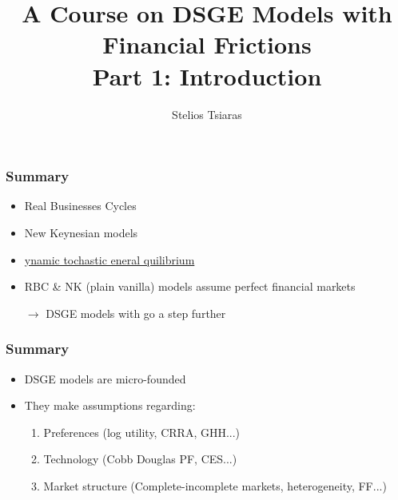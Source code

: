 \documentclass[xcolor=dvipsnames,handout,aspectratio=169]{beamer}
\title[\today]{\textbf{A Course on DSGE Models with Financial Frictions \\ Part 1: Introduction}}
\author{Stelios Tsiaras}
\institute{European University Institute}
\begin{document}
\begin{frame}[noframenumbering]
\titlepage 
\end{frame}

\begin{frame}[c]\frametitle {\textbf{Summary}} \label{conclusion}
\begin{itemize}
    \setlength\itemsep{2em}
    \item Real Businesses Cycles 
    \item New Keynesian models 
    \item \underline{{\color{Magenta}{D}}ynamic {\color{Magenta}{S}}tochastic {\color{Magenta}{G}}eneral {\color{Magenta}{E}}quilibrium}
    \item RBC \& NK (plain vanilla) models assume perfect financial markets 

$\rightarrow$ DSGE models with {\color{Magenta}{financial frictions}} go a step further
\end{itemize}
\end{frame}

\begin{frame}[c]\frametitle {\textbf{Summary}} \label{conclusion}
\begin{itemize}
    \setlength\itemsep{2em}
\item DSGE models are micro-founded 
\item They make assumptions regarding: 
\begin{enumerate}
    \item Preferences (log utility, CRRA, GHH...)
    \item Technology (Cobb Douglas PF, CES...)
    \item Market structure (Complete-incomplete markets, heterogeneity, FF...)
\end{enumerate}

\end{itemize}
\end{frame}
\end{document}
